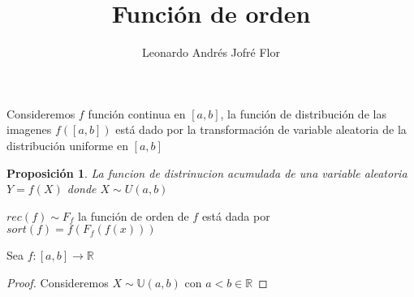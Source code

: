 \documentclass{article}
\title{Función de orden}
\author{Leonardo Andrés Jofré Flor}
\begin{document}
\newtheorem{prop}{Proposición}
\maketitle Consideremos $f$ función continua en $[a,b]$, la
función de distribución de las imagenes $f\left([a,b]\right)$
está dado por la transformación de variable aleatoria de la
distribución uniforme en $[a,b]$

\begin{prop} La funcion de distrinucion acumulada de una variable
  aleatoria $Y=f\left(X\right)$ donde $X\sim U\left(a,b\right)$  
\end{prop}

$rec(f)\sim F_f$ la función de orden de $f$ está dada por $sort(f) =
f(F_f(f(x)))$

Sea $f:\left[a,b\right]\to\mathbb{R}$

\begin{proof}
	Consideremos $X\sim \mathbb{U}\left(a,b\right)$ con $a<b \in \mathbb{R}$
\end{proof}
\end{document}
